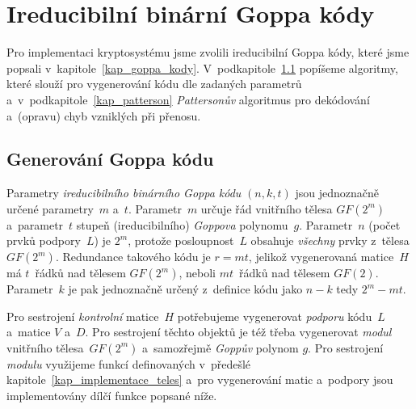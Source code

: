 \documentclass[thesis=M,czech,hidelinks]{FITthesis}[2012/06/26]
\newcommand{\0}{{\textcolor[gray]{0.75}{0}}}
\begin{document}
\clearpage

\section{Ireducibilní binární Goppa kódy}

Pro implementaci kryptosystému jsme zvolili ireducibilní Goppa kódy, které jsme
popsali v~kapitole~\ref{kap_goppa_kody}.  V~podkapitole~\ref{kap_generovani}
popíšeme algoritmy, které slouží pro vygenerování kódu dle zadaných parametrů
a~v~podkapitole~\ref{kap_patterson} \emph{Pattersonův} algoritmus pro dekódování
a~(opravu) chyb vzniklých při přenosu.


\subsection{Generování Goppa kódu}\label{kap_generovani}

Parametry \emph{ireducibilního binárního Goppa kódu} $(n,k,t)$ jsou jednoznačně
určené parametry~$m$ a~$t$. Parametr~$m$ určuje řád vnitřního tělesa $GF(2^m)$
a~parametr~$t$ stupeň (ireducibilního) \emph{Goppova} polynomu~$g$. Parametr~$n$
(počet prvků podpory~$L$) je $2^m$, protože posloupnost~$L$ obsahuje
\emph{všechny} prvky z~tělesa $GF(2^m)$. Redundance takového kódu je $r=mt$,
jelikož vygenerovaná matice~$H$ má $t$~řádků nad tělesem $GF(2^m)$, neboli
$mt$~řádků nad tělesem $GF(2)$. Parametr~$k$ je pak jednoznačně určený
z~definice kódu jako $n-k$ tedy $2^m-mt$.


Pro sestrojení \emph{kontrolní} matice~$H$ potřebujeme vygenerovat
\emph{podporu} kódu~$L$ a~matice $V$ a~$D$. Pro sestrojení těchto objektů je též
třeba vygenerovat \emph{modul} vnitřního tělesa~$GF(2^m)$ a~samozřejmě
\emph{Goppův} polynom $g$. Pro sestrojení \emph{modulu} využijeme funkcí
definovaných v~předešlé kapitole~\ref{kap_implementace_teles} a~pro vygenerování
matic a~podpory jsou implementovány dílčí funkce popsané níže.
\end{document}
